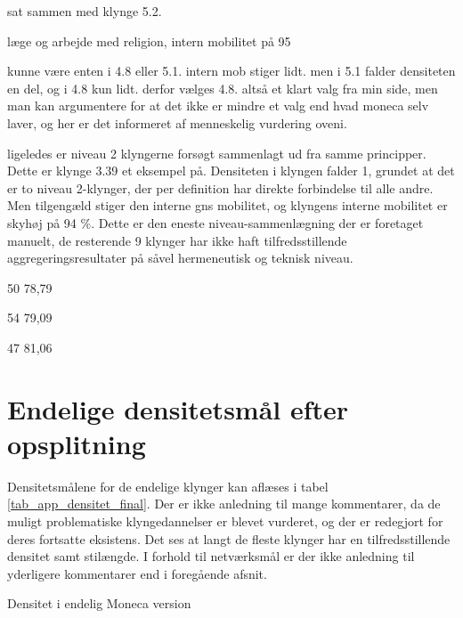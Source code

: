  sat sammen med klynge 5.2. 


læge og arbejde med religion, intern mobilitet på 95 %


 kunne være enten i 4.8 eller 5.1. intern mob stiger lidt. men i 5.1 falder densiteten en del, og i 4.8 kun lidt. derfor vælges 4.8. altså et klart valg fra min side, men man kan argumentere for at det ikke er mindre et valg end hvad moneca selv laver, og her er det informeret af menneskelig vurdering oveni. 


ligeledes er niveau 2 klyngerne forsøgt sammenlagt ud fra samme principper. 
  Dette er klynge 3.39 et eksempel på. Densiteten i klyngen falder 1, grundet at det er to niveau 2-klynger, der per definition har direkte forbindelse til alle andre. Men tilgengæld stiger den interne gns mobilitet, og klyngens interne mobilitet er skyhøj på 94 \%. Dette er den eneste niveau-sammenlægning der er foretaget manuelt, de resterende 9 klynger har ikke haft tilfredsstillende aggregeringsresultater på såvel hermeneutisk og teknisk niveau.  
  



50 78,79 %

54 79,09 %

47 81,06 %





%
\section{Endelige densitetsmål efter opsplitning}
%

Densitetsmålene for de endelige klynger kan aflæses i tabel \ref{tab_app_densitet_final}. Der er ikke anledning til mange kommentarer, da de muligt problematiske klyngedannelser er blevet vurderet, og der er redegjort for deres fortsatte eksistens. Det ses at langt de fleste klynger har en tilfredsstillende densitet samt stilængde. I forhold til netværksmål er der ikke anledning til yderligere kommentarer end i foregående afsnit. 
%
\begin{table}[H]
  \centering
    \resizebox{5cm}{!}{%

}
  \caption{Densitet i endelig Moneca version}
  \label{tab_app_densitet_final}%
\end{table}
%
